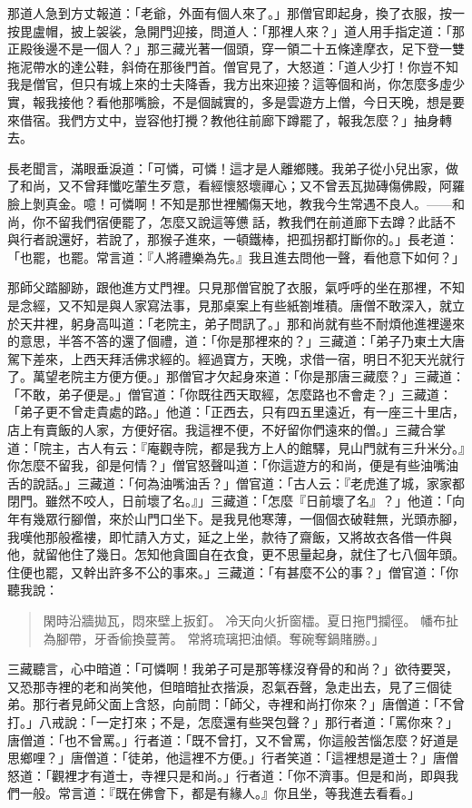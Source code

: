 那道人急到方丈報道：「老爺，外面有個人來了。」那僧官即起身，換了衣服，按一按毘盧帽，披上袈裟，急開門迎接，問道人：「那裡人來？」道人用手指定道：「那正殿後邊不是一個人？」那三藏光著一個頭，穿一領二十五條達摩衣，足下登一雙拖泥帶水的達公鞋，斜倚在那後門首。僧官見了，大怒道：「道人少打！你豈不知我是僧官，但只有城上來的士夫降香，我方出來迎接？這等個和尚，你怎麼多虛少實，報我接他？看他那嘴臉，不是個誠實的，多是雲遊方上僧，今日天晚，想是要來借宿。我們方丈中，豈容他打攪？教他往前廊下蹲罷了，報我怎麼？」抽身轉去。

長老聞言，滿眼垂淚道：「可憐，可憐！這才是人離鄉賤。我弟子從小兒出家，做了和尚，又不曾拜懺吃葷生歹意，看經懷怒壞禪心；又不曾丟瓦拋磚傷佛殿，阿羅臉上剝真金。噫！可憐啊！不知是那世裡觸傷天地，教我今生常遇不良人。——和尚，你不留我們宿便罷了，怎麼又說這等憊𪬯話，教我們在前道廊下去蹲？此話不與行者說還好，若說了，那猴子進來，一頓鐵棒，把孤拐都打斷你的。」長老道：「也罷，也罷。常言道：『人將禮樂為先。』我且進去問他一聲，看他意下如何？」

那師父踏腳跡，跟他進方丈門裡。只見那僧官脫了衣服，氣呼呼的坐在那裡，不知是念經，又不知是與人家寫法事，見那桌案上有些紙劄堆積。唐僧不敢深入，就立於天井裡，躬身高叫道：「老院主，弟子問訊了。」那和尚就有些不耐煩他進裡邊來的意思，半答不答的還了個禮，道：「你是那裡來的？」三藏道：「弟子乃東土大唐駕下差來，上西天拜活佛求經的。經過寶方，天晚，求借一宿，明日不犯天光就行了。萬望老院主方便方便。」那僧官才欠起身來道：「你是那唐三藏麼？」三藏道：「不敢，弟子便是。」僧官道：「你既往西天取經，怎麼路也不會走？」三藏道：「弟子更不曾走貴處的路。」他道：「正西去，只有四五里遠近，有一座三十里店，店上有賣飯的人家，方便好宿。我這裡不便，不好留你們遠來的僧。」三藏合掌道：「院主，古人有云：『庵觀寺院，都是我方上人的館驛，見山門就有三升米分。』你怎麼不留我，卻是何情？」僧官怒聲叫道：「你這遊方的和尚，便是有些油嘴油舌的說話。」三藏道：「何為油嘴油舌？」僧官道：「古人云：『老虎進了城，家家都閉門。雖然不咬人，日前壞了名。』」三藏道：「怎麼『日前壞了名』？」他道：「向年有幾眾行腳僧，來於山門口坐下。是我見他寒薄，一個個衣破鞋無，光頭赤腳，我嘆他那般襤褸，即忙請入方丈，延之上坐，款待了齋飯，又將故衣各借一件與他，就留他住了幾日。怎知他貪圖自在衣食，更不思量起身，就住了七八個年頭。住便也罷，又幹出許多不公的事來。」三藏道：「有甚麼不公的事？」僧官道：「你聽我說：
\begin{quote}
閑時沿牆拋瓦，悶來壁上扳釘。
冷天向火折窗櫺。夏日拖門攔徑。
幡布扯為腳帶，牙香偷換蔓菁。
常將琉璃把油傾。奪碗奪鍋賭勝。」
\end{quote}

三藏聽言，心中暗道：「可憐啊！我弟子可是那等樣沒脊骨的和尚？」欲待要哭，又恐那寺裡的老和尚笑他，但暗暗扯衣揩淚，忍氣吞聲，急走出去，見了三個徒弟。那行者見師父面上含怒，向前問：「師父，寺裡和尚打你來？」唐僧道：「不曾打。」八戒說：「一定打來；不是，怎麼還有些哭包聲？」那行者道：「罵你來？」唐僧道：「也不曾罵。」行者道：「既不曾打，又不曾罵，你這般苦惱怎麼？好道是思鄉哩？」唐僧道：「徒弟，他這裡不方便。」行者笑道：「這裡想是道士？」唐僧怒道：「觀裡才有道士，寺裡只是和尚。」行者道：「你不濟事。但是和尚，即與我們一般。常言道：『既在佛會下，都是有緣人。』你且坐，等我進去看看。」

